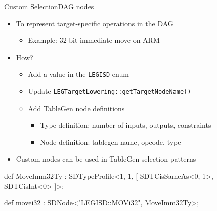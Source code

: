 \begin{frame}[fragile]{Custom SelectionDAG nodes}

\begin{itemize}
    \item To represent target-specific operations in the DAG
    \begin{itemize}
        \item Example: 32-bit immediate move on ARM
    \end{itemize}
    \item How?
    \begin{itemize}
        \item Add a value in the \texttt{LEGISD} enum
        \item Update \texttt{LEGTargetLowering::getTargetNodeName()}
        \item Add TableGen node definitions
        \begin{itemize}
            \item Type definition: number of inputs, outputs, constraints
            \item Node definition: tablegen name, opcode, type
        \end{itemize}
    \end{itemize}
    \item Custom nodes can be used in TableGen selection patterns
\end{itemize}

\begin{codebox}
def MoveImm32Ty : SDTypeProfile<1, 1, [
  SDTCisSameAs<0, 1>, SDTCisInt<0>
]>;

def movei32 : SDNode<"LEGISD::MOVi32", MoveImm32Ty>;
\end{codebox}

\end{frame}


